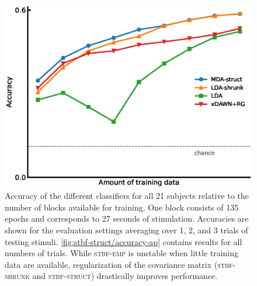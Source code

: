   \begin{figure}
		\includegraphics[width=.66\linewidth]{figures/stbf_struct/accuracy.eps}
    \caption[Clasifier accuracy in function of available training data.]{%
      Accuracy of the different classifiers for all 21 subjects relative to the
			number of blocks available for training. One block consists of 135
			epochs and corresponds to 27 seconds of stimulation. Accuracies
			are shown for the evaluation settings averaging over 1, 2, and
			3 trials of testing stimuli.
			\cref{fig:stbf-struct/accuracy-ap} contains results for all numbers of trials.
			While \textsc{stbf-emp} is unstable when little training data
			are available,
			regularization of the covariance matrix (\textsc{stbf-shrunk} and
			\textsc{stbf-struct}) drastically improves performance.}
		\label{fig:accuracy}
	\end{figure}


